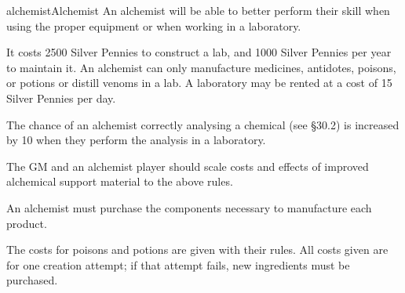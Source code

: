 \begin{Skill}[1.1]{alchemist}{Alchemist}
An alchemist will be able to better perform their skill when using the
proper equipment or when working in a laboratory.

It costs 2500 Silver Pennies to construct a lab, and 1000 Silver
Pennies per year to maintain it.  An alchemist can only manufacture
medicines, antidotes, poisons, or potions or distill venoms in a lab.
A laboratory may be rented at a cost of 15 Silver Pennies per day.

The chance of an alchemist correctly analysing a chemical (see §30.2)
is increased by 10 when they perform the analysis in a laboratory.

The GM and an alchemist player should scale costs and effects of
improved alchemical support material to the above rules.

An alchemist must purchase the components necessary to manufacture
each product.

The costs for poisons and potions are given with their rules.  All
costs given are for one creation attempt; if that attempt fails, new
ingredients must be purchased.

\end{Skill}

